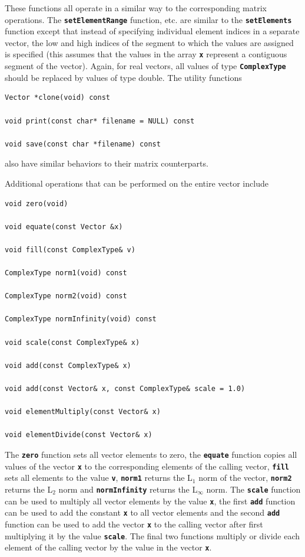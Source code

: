 \documentclass[12pt]{report} %
\begin{document}
These functions all operate in a similar way to the corresponding matrix operations. The \texttt{\textbf{setElementRange}} function, etc. are similar to the \texttt{\textbf{setElements}} function except that instead of specifying individual element indices in a separate vector, the low and high indices of the segment to which the values are assigned is specified (this assumes that the values in the array \texttt{\textbf{x}} represent a contiguous segment of the vector).  Again, for real vectors, all values of type \texttt{\textbf{ComplexType}} should be replaced by values of type double. The utility functions

{
\color{red}
\begin{Verbatim}[fontseries=b]
Vector *clone(void) const

void print(const char* filename = NULL) const

void save(const char *filename) const
\end{Verbatim}
}

also have similar behaviors to their matrix counterparts.

Additional operations that can be performed on the entire vector include

{
\color{red}
\begin{Verbatim}[fontseries=b]
void zero(void)

void equate(const Vector &x)

void fill(const ComplexType& v)

ComplexType norm1(void) const

ComplexType norm2(void) const

ComplexType normInfinity(void) const

void scale(const ComplexType& x)

void add(const ComplexType& x)

void add(const Vector& x, const ComplexType& scale = 1.0)

void elementMultiply(const Vector& x)

void elementDivide(const Vector& x)
\end{Verbatim}
}

The \texttt{\textbf{zero}} function sets all vector elements to zero, the \texttt{\textbf{equate}} function copies all values of the vector \texttt{\textbf{x}} to the corresponding elements of the calling vector, \texttt{\textbf{fill}} sets all elements to the value \texttt{\textbf{v}}, \texttt{\textbf{norm1}} returns the L${}_{1}$ norm of the vector, \texttt{\textbf{norm2}} returns the L${}_{2}$ norm and \texttt{\textbf{normInfinity}} returns the L${}_{\mathrm{\infty }}$ norm. The \texttt{\textbf{scale}} function can be used to multiply all vector elements by the value \texttt{\textbf{x}}, the first \texttt{\textbf{add}} function can be used to add the constant \texttt{\textbf{x}} to all vector elements and the second \texttt{\textbf{add}} function can be used to add the vector \texttt{\textbf{x}} to the calling vector after first multiplying it by the value \texttt{\textbf{scale}}. The final two functions multiply or divide each element of the calling vector by the value in the vector \texttt{\textbf{x}}.
\end{document}
